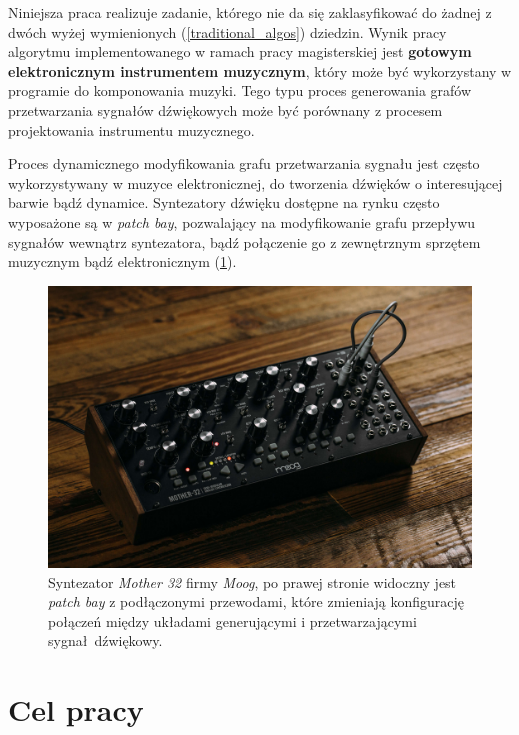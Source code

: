 Niniejsza praca realizuje zadanie,
którego nie da się zaklasyfikować do żadnej z dwóch wyżej wymienionych (\ref{traditional_algos}) dziedzin.
Wynik pracy algorytmu implementowanego w ramach pracy magisterskiej jest \textbf{gotowym elektronicznym
instrumentem muzycznym}, który może być wykorzystany w programie do komponowania muzyki.
Tego typu proces generowania grafów przetwarzania sygnałów dźwiękowych może być porównany z procesem projektowania instrumentu muzycznego.

Proces dynamicznego modyfikowania grafu przetwarzania sygnału jest często wykorzystywany w muzyce
elektronicznej, do tworzenia dźwięków o interesującej barwie bądź dynamice. Syntezatory dźwięku
dostępne na rynku często wyposażone są w \textit{patch bay}, pozwalający na modyfikowanie
grafu przepływu sygnałów wewnątrz syntezatora, bądź połączenie go z zewnętrznym sprzętem muzycznym
bądź elektronicznym (\ref{fig:mother32}).

\begin{figure}[H]
    \centering
    \includegraphics[width=0.7\linewidth]{rys01/mother32.jpg}
    \caption{Syntezator \textit{Mother 32} firmy \textit{Moog}, po prawej stronie widoczny
    jest \textit{patch bay} z podłączonymi przewodami, które zmieniają konfigurację
    połączeń między układami generującymi i przetwarzającymi sygnał dźwiękowy.}
    \label{fig:mother32}
\end{figure}


\section{Cel pracy}



